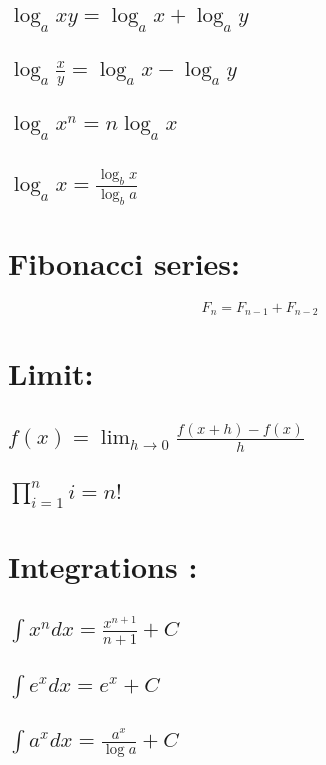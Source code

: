 \documentclass[27pt]{article}
\begin{document}
  \subsection{$\displaystyle \log_axy = \log_ax + \log_ay  $}
  \subsection{$\displaystyle \log_a \frac{x}{y} = \log_ax - \log_ay  $}
  \subsection{$\displaystyle \log_ax^n = n\log_ax  $}
  \subsection{$\displaystyle \log_ax = \frac{\log_bx }{\log_ba}  $}
  
\section{Fibonacci series:}  $$ F_n=F_{n-1}+F_{n-2} $$    

\section{Limit:}   
 \subsection{$ f(x)=\lim_{h\to 0}\frac{f(x+h)-f(x)}{h}  $}
 \subsection{$ \displaystyle{\prod_{i=1}^ni=n! }$} 
 
\section{Integrations :}
 \subsection{$ \int x^ndx ={ \frac{x^{n+1}}{n+1}} + C $}
 \subsection{$ \int e^xdx = e^x + C $}   
 \subsection{$ \int a^xdx ={ \frac{a^x}{\log a}} + C $} 
\end{document}
